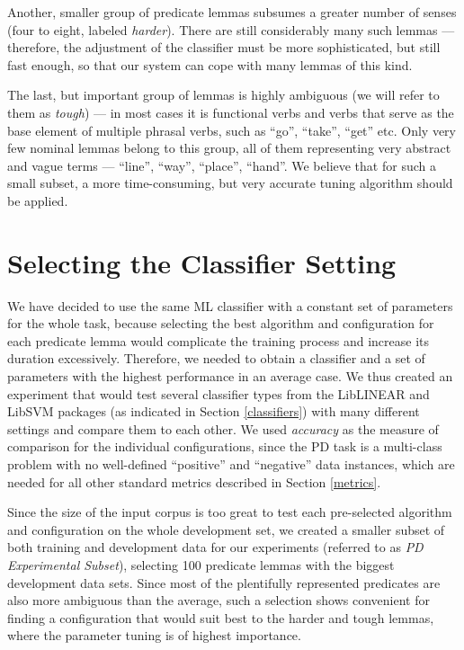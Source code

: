 \documentclass[12pt,notitlepage]{report}
\begin{document}
Another, smaller group of predicate lemmas subsumes a greater number of senses (four to eight, labeled \emph{harder}). There are still considerably many such lemmas --- therefore, the adjustment of the classifier must be more sophisticated, but still fast enough, so that our system can cope with many lemmas of this kind.

The last, but important group of lemmas is highly ambiguous (we will refer to them as \emph{tough}) --- in most cases it is functional verbs and verbs that serve as the base element of multiple phrasal verbs, such as ``go'', ``take'', ``get'' etc. Only very few nominal lemmas belong to this group, all of them representing very abstract and vague terms --- ``line'', ``way'', ``place'', ``hand''. We believe that for such a small subset, a more time-consuming, but very accurate tuning algorithm should be applied.

\section{Selecting the Classifier Setting}\label{classifier-setting}

We have decided to use the same ML classifier with a constant set of parameters for the whole task, because selecting the best algorithm and configuration for each predicate lemma would complicate the training process and increase its duration excessively. Therefore, we needed to obtain a classifier and a set of parameters with the highest performance in an average case. We thus created an experiment that would test several classifier types from the LibLINEAR and LibSVM packages (as indicated in Section \ref{classifiers}) with many different settings and compare them to each other. We used \emph{accuracy} as the measure of comparison for the individual configurations, since the PD task is a multi-class problem with no well-defined ``positive'' and ``negative'' data instances, which are needed for all other standard metrics described in Section \ref{metrics}.

Since the size of the input corpus is too great to test each pre-selected algorithm and configuration on the whole development set, we created a smaller subset of both training and development data for our experiments (referred to as \emph{PD Experimental Subset}), selecting 100 predicate lemmas with the biggest development data sets. Since most of the plentifully represented predicates are also more ambiguous than the average, such a selection shows convenient for finding a configuration that would suit best to the harder and tough lemmas, where the parameter tuning is of highest importance.
\end{document}
